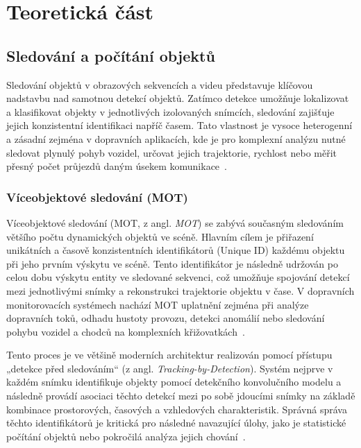 \documentclass[male,czech,api_bc]{kitheses}
\begin{document}
\chapter{Teoretická část}


\section{Sledování a počítání objektů}
Sledování objektů v obrazových sekvencích a videu představuje klíčovou nadstavbu nad samotnou detekcí objektů. Zatímco detekce umožňuje lokalizovat a klasifikovat objekty v jednotlivých izolovaných snímcích, sledování zajišťuje jejich konzistentní identifikaci napříč časem. Tato vlastnost je vysoce heterogenní a zásadní zejména v dopravních aplikacích, kde je pro komplexní analýzu nutné sledovat plynulý pohyb vozidel, určovat jejich trajektorie, rychlost nebo měřit přesný počet průjezdů daným úsekem komunikace~\cite{szeliski_computer_vision, zhou_traffic_survey_2024}.

\subsection{Víceobjektové sledování (MOT)}
Víceobjektové sledování (\acs{MOT}, z angl. \textit{\acl{MOT}}) se zabývá současným sledováním většího počtu dynamických objektů ve scéně. Hlavním cílem je přiřazení unikátních a časově konzistentních identifikátorů (Unique \acs{ID}) každému objektu při jeho prvním výskytu ve scéně. Tento identifikátor je následně udržován po celou dobu výskytu entity ve sledované sekvenci, což umožňuje spojování detekcí mezi jednotlivými snímky a rekonstrukci trajektorie objektu v čase. V dopravních monitorovacích systémech nachází \acs{MOT} uplatnění zejména při analýze dopravních toků, odhadu hustoty provozu, detekci anomálií nebo sledování pohybu vozidel a chodců na komplexních křižovatkách~\cite{zhou_traffic_survey_2024}.

Tento proces je ve většině moderních architektur realizován pomocí přístupu „detekce před sledováním“ (z angl. \textit{Tracking-by-Detection}). Systém nejprve v každém snímku identifikuje objekty pomocí detekčního konvolučního modelu a následně provádí asociaci těchto detekcí mezi po sobě jdoucími snímky na základě kombinace prostorových, časových a vzhledových charakteristik. Správná správa těchto identifikátorů je kritická pro následné navazující úlohy, jako je statistické počítání objektů nebo pokročilá analýza jejich chování~\cite{szeliski_computer_vision}.
\end{document}
